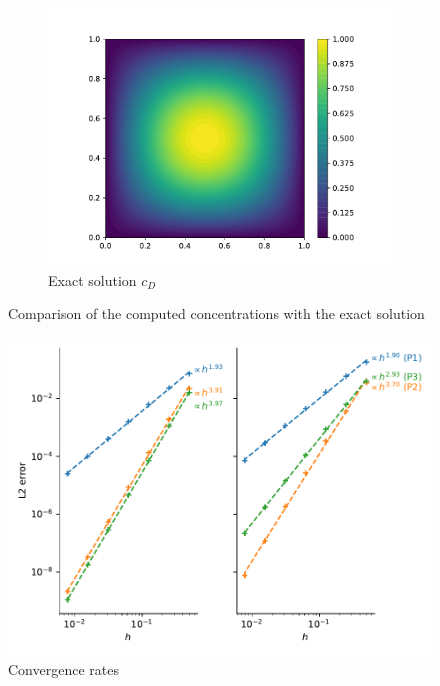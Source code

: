 \begin{figure}
\begin{subfigure}{0.3\linewidth}
        \includegraphics[width=\linewidth]{Figures/Chapter2/c_exact.pdf}
        \caption{Exact solution $c_D$}
    \end{subfigure}
    \caption{Comparison of the computed concentrations with the exact solution}
    \label{fig: results MMS 2D H transport}
\end{figure}

\begin{figure}
    \centering
    \includegraphics[width=\linewidth]{Figures/Chapter2/convergence_rate_H.pdf}
    \caption{Convergence rates}
    \label{fig: convergence rates H}
\end{figure}



